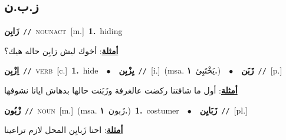 \documentclass[10pt,a4paper,twoside]{article} %
\begin{document}
\begin{multicols}{2}
{{{{{{{\vspace{-3mm}
\subsection*{\color{blue}\foreignlanguage{arabic}{ز.ب.ن}\color{blue}{}} 

{\setlength\topsep{0pt}\textbf{\foreignlanguage{arabic}{زَابِن}}\ {\color{gray}\texttt{//}\color{black}}\ \textsc{noun\textunderscore act}\ [m.]\ \textbf{1.}~hiding\  \begin{flushright}\color{gray}\foreignlanguage{arabic}{\textbf{\underline{\foreignlanguage{arabic}{أمثلة}}}: أخوك ليش زابِن حاله هيك؟}\end{flushright}\color{black}} \vspace{2mm}

{\setlength\topsep{0pt}\textbf{\foreignlanguage{arabic}{اِزْبِن}}\ {\color{gray}\texttt{//}\color{black}}\ \textsc{verb}\ [c.]\ \textbf{1.}~hide\ \ $\bullet$\ \ \setlength\topsep{0pt}\textbf{\foreignlanguage{arabic}{يِزْبِن}}\ {\color{gray}\texttt{//}\color{black}}\ [i.]\ \color{gray}(msa. \foreignlanguage{arabic}{يَخْتَبِئ}~\foreignlanguage{arabic}{\textbf{١.}})\color{black}\ \ $\bullet$\ \ \setlength\topsep{0pt}\textbf{\foreignlanguage{arabic}{زَبَن}}\ {\color{gray}\texttt{//}\color{black}}\ [p.]\  \begin{flushright}\color{gray}\foreignlanguage{arabic}{\textbf{\underline{\foreignlanguage{arabic}{أمثلة}}}: أول ما شافتنا ركضت عالغرفة وزَبَنت حالها بدهاش ايانا نشوفها}\end{flushright}\color{black}} \vspace{2mm}

{\setlength\topsep{0pt}\textbf{\foreignlanguage{arabic}{زْبُون}}\ {\color{gray}\texttt{//}\color{black}}\ \textsc{noun}\ [m.]\ \color{gray}(msa. \foreignlanguage{arabic}{زَبون}~\foreignlanguage{arabic}{\textbf{١.}})\color{black}\ \textbf{1.}~costumer\ \ $\bullet$\ \ \setlength\topsep{0pt}\textbf{\foreignlanguage{arabic}{زَبَايِن}}\ {\color{gray}\texttt{//}\color{black}}\ [pl.]\  \begin{flushright}\color{gray}\foreignlanguage{arabic}{\textbf{\underline{\foreignlanguage{arabic}{أمثلة}}}: احنا زَبايِن المحل لازم تراعينا}\end{flushright}\color{black}} \vspace{2mm}

}}}}}}}
\end{multicols}
\end{document}
